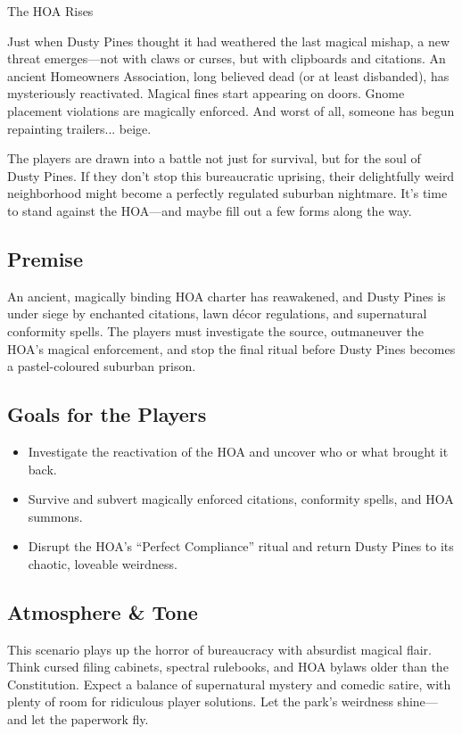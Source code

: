 \begin{WyrdScenarioHeading}{The HOA Rises}
    \label{scenario:hoa-rises}

    Just when Dusty Pines thought it had weathered the last magical mishap, a new threat emerges—not with claws or curses, but with clipboards and citations. An ancient Homeowners Association, long believed dead (or at least disbanded), has mysteriously reactivated. Magical fines start appearing on doors. Gnome placement violations are magically enforced. And worst of all, someone has begun repainting trailers... beige.

    The players are drawn into a battle not just for survival, but for the soul of Dusty Pines. If they don’t stop this bureaucratic uprising, their delightfully weird neighborhood might become a perfectly regulated suburban nightmare. It’s time to stand against the HOA—and maybe fill out a few forms along the way.

    \subsection*{Premise}
    An ancient, magically binding HOA charter has reawakened, and Dusty Pines is under siege by enchanted citations, lawn décor regulations, and supernatural conformity spells. The players must investigate the source, outmaneuver the HOA’s magical enforcement, and stop the final ritual before Dusty Pines becomes a pastel-coloured suburban prison.

    \subsection*{Goals for the Players}
    \begin{itemize}
        \item Investigate the reactivation of the HOA and uncover who or what brought it back.
        \item Survive and subvert magically enforced citations, conformity spells, and HOA summons.
        \item Disrupt the HOA’s “Perfect Compliance” ritual and return Dusty Pines to its chaotic, loveable weirdness.
    \end{itemize}

    \subsection*{Atmosphere \& Tone}
    This scenario plays up the horror of bureaucracy with absurdist magical flair. Think cursed filing cabinets, spectral rulebooks, and HOA bylaws older than the Constitution. Expect a balance of supernatural mystery and comedic satire, with plenty of room for ridiculous player solutions. Let the park’s weirdness shine—and let the paperwork fly.
\end{WyrdScenarioHeading}

